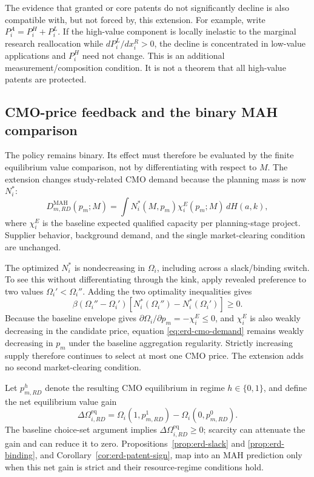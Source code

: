 The evidence that granted or core patents do not significantly decline is
also compatible with, but not forced by, this extension. For example, write
\(P_i^A=P_i^H+P_i^L\). If the high-value component is locally inelastic to
the marginal research reallocation while \(dP_i^L/dx_i^R>0\), the decline is
concentrated in low-value applications and \(P_i^H\) need not change. This is
an additional measurement/composition condition. It is not a theorem that
all high-value patents are protected.

\subsection{CMO-price feedback and the binary MAH comparison}
\label{subsec:erd-cmo-feedback}

The policy remains binary. Its effect must therefore be evaluated by the
finite equilibrium value comparison, not by differentiating with respect to
\(M\). The extension changes study-related CMO demand because the planning
mass is now \(N_i^*\):
\begin{equation}
  D_{m,RD}^{\mathrm{MAH}}(p_m;M)
  =
  \int
  N_i^*(M,p_m)\chi_i^E(p_m;M)\,dH(a,k),
  \label{eq:erd-cmo-demand}
\end{equation}
where \(\chi_i^E\) is the baseline expected qualified capacity per
planning-stage project. Supplier behavior, background demand, and the single
market-clearing condition are unchanged.

The optimized \(N_i^*\) is nondecreasing in \(\Omega_i\), including across a
slack/binding switch. To see this without differentiating through the kink,
apply revealed preference to two values \(\Omega_i'<\Omega_i''\). Adding the
two optimality inequalities gives
\[
  \beta(\Omega_i''-\Omega_i')
  [N_i^*(\Omega_i'')-N_i^*(\Omega_i')]
  \geq0.
\]
Because the baseline envelope gives \(\partial\Omega_i/\partial p_m
=-\chi_i^E\leq0\), and \(\chi_i^E\) is also weakly decreasing in the
candidate price, equation \eqref{eq:erd-cmo-demand} remains weakly decreasing
in \(p_m\) under the baseline aggregation regularity. Strictly increasing
supply therefore continues to select at most one CMO price. The extension
adds no second market-clearing condition.

Let \(p_{m,RD}^h\) denote the resulting CMO equilibrium in regime
\(h\in\{0,1\}\), and define the net equilibrium value gain
\begin{equation}
  \Delta\Omega_{i,RD}^{\mathrm{eq}}
  =
  \Omega_i(1,p_{m,RD}^1)
  -\Omega_i(0,p_{m,RD}^0).
  \label{eq:erd-equilibrium-value-gain}
\end{equation}
The baseline choice-set argument implies
\(\Delta\Omega_{i,RD}^{\mathrm{eq}}\geq0\); scarcity can attenuate the gain
and can reduce it to zero. Propositions~\ref{prop:erd-slack} and
\ref{prop:erd-binding}, and Corollary~\ref{cor:erd-patent-sign}, map into an
MAH prediction only when this net gain is strict and their resource-regime
conditions hold.

